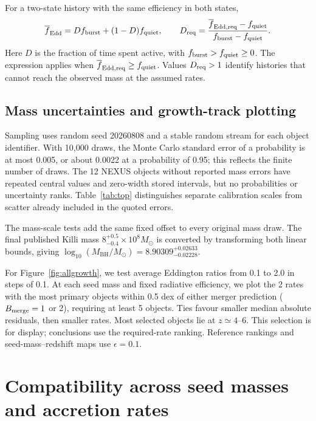 \documentclass[11pt]{article}
\newcommand{\mbh}{M_{\mathrm{BH}}}
\begin{document}
For a two-state history with the same efficiency in both states,
\begin{equation}
\overline{f}_{\mathrm{Edd}}=D f_{\rm burst}+(1-D)f_{\rm quiet},\qquad
D_{\rm req}=\frac{\overline{f}_{\mathrm{Edd,req}}-f_{\rm quiet}}
{f_{\rm burst}-f_{\rm quiet}}.
\label{eq:dutycycle}
\end{equation}
Here $D$ is the fraction of time spent active, with
$f_{\rm burst}>f_{\rm quiet}\geq0$. The expression applies when
$\overline{f}_{\mathrm{Edd,req}}\geq f_{\rm quiet}$. Values $D_{\rm req}>1$
identify histories that cannot reach the observed mass at the assumed rates.

\subsection{Mass uncertainties and growth-track plotting}
\label{app:implementation}

Sampling uses random seed 20260808 and a stable random stream for each object
identifier. With 10,000 draws, the Monte Carlo standard error of a probability
is at most 0.005, or about 0.0022 at a probability of 0.95; this reflects the
finite number of draws. The 12 NEXUS objects without reported mass errors
have repeated central values and zero-width stored intervals, but no
probabilities or uncertainty ranks. Table~\ref{tab:top} distinguishes separate
calibration scales from scatter already included in the quoted errors.

The mass-scale tests add the same fixed offset to every original mass draw.
The final published Killi mass
$8^{+0.5}_{-0.4}\times10^8M_\odot$ is converted by transforming both linear
bounds, giving $\log_{10}(\mbh/M_\odot)=8.90309^{+0.02633}_{-0.02228}$.

For Figure~\ref{fig:allgrowth}, we test average Eddington ratios from 0.1 to
2.0 in steps of 0.1. At each seed mass and fixed radiative efficiency, we plot
the 2 rates with the most primary objects within 0.5 dex of either merger
prediction ($B_{\rm merge}=1$ or 2), requiring at least 5 objects.
Ties favour smaller median absolute residuals, then smaller rates. Most
selected objects lie at $z\simeq4$--6. This selection is for display;
conclusions use the required-rate ranking. Reference rankings and
seed-mass--redshift maps use $\epsilon=0.1$.

\section{Compatibility across seed masses and accretion rates}
\label{app:compatibility}
\end{document}
